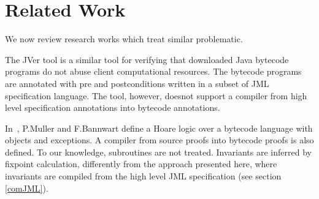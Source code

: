 \section{Related Work} \label{relWork}


We now review research works which treat similar problematic.


The JVer tool \cite{DBLP:conf/cav/ChanderEILN05} is a similar tool for verifying that downloaded Java bytecode programs do not abuse client computational resources.
The bytecode programs are annotated with pre and postconditions written in a subset of JML specification language. The tool, however, doesnot support a compiler from high level specification annotations into bytecode annotations.  

 
In~\cite{BM05plb},  P.Muller and F.Bannwart define a Hoare logic over a 
bytecode language with objects and  exceptions. A compiler from source proofs into bytecode proofs is also defined.
 To our knowledge, subroutines are not treated. Invariants are inferred by fixpoint calculation, differently 
from the approach presented here, where invariants are compiled from the high level JML specification (see section \ref{comJML}). 
 
